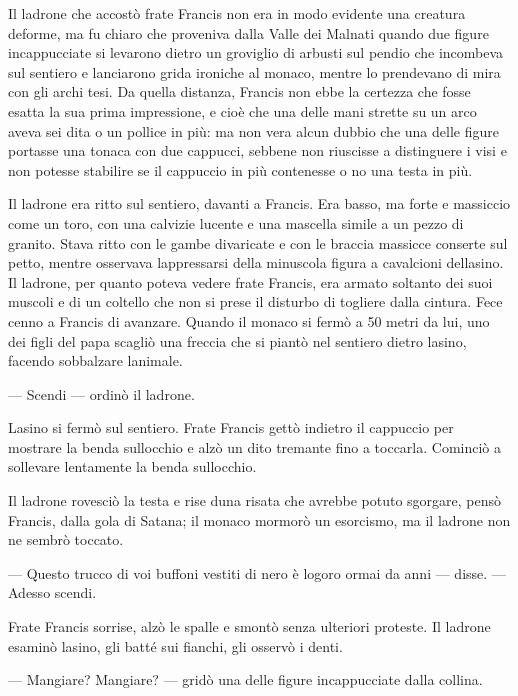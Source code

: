 Il ladrone che accostò frate Francis non era in modo evidente una
creatura deforme, ma fu chiaro che proveniva dalla Valle dei Malnati
quando due figure incappucciate si levarono dietro un groviglio di
arbusti sul pendio che incombeva sul sentiero e lanciarono grida
ironiche al monaco, mentre lo prendevano di mira con gli archi tesi. Da
quella distanza, Francis non ebbe la certezza che fosse esatta la sua
prima impressione, e cioè che una delle mani strette su un arco aveva
sei dita o un pollice in più: ma non v\textquotesingle era alcun dubbio
che una delle figure portasse una tonaca con due cappucci, sebbene non
riuscisse a distinguere i visi e non potesse stabilire se il cappuccio
in più contenesse o no una testa in più.

Il ladrone era ritto sul sentiero, davanti a Francis. Era basso, ma
forte e massiccio come un toro, con una calvizie lucente e una mascella
simile a un pezzo di granito. Stava ritto con le gambe divaricate e con
le braccia massicce conserte sul petto, mentre osservava
l\textquotesingle appressarsi della minuscola figura a cavalcioni
dell\textquotesingle asino. Il ladrone, per quanto poteva vedere frate
Francis, era armato soltanto dei suoi muscoli e di un coltello che non
si prese il disturbo di togliere dalla cintura. Fece cenno a Francis di
avanzare. Quando il monaco si fermò a 50 metri da lui, uno dei figli del
papa scagliò una freccia che si piantò nel sentiero dietro
l\textquotesingle asino, facendo sobbalzare l\textquotesingle animale.

--- Scendi --- ordinò il ladrone.

L\textquotesingle asino si fermò sul sentiero. Frate Francis gettò
indietro il cappuccio per mostrare la benda sull\textquotesingle occhio
e alzò un dito tremante fino a toccarla. Cominciò a sollevare lentamente
la benda sull\textquotesingle occhio.

Il ladrone rovesciò la testa e rise d\textquotesingle una risata che
avrebbe potuto sgorgare, pensò Francis, dalla gola di Satana; il monaco
mormorò un esorcismo, ma il ladrone non ne sembrò toccato.

--- Questo trucco di voi buffoni vestiti di nero è logoro ormai da anni
--- disse. --- Adesso scendi.

Frate Francis sorrise, alzò le spalle e smontò senza ulteriori proteste.
Il ladrone esaminò l\textquotesingle asino, gli batté sui fianchi, gli
osservò i denti.

--- Mangiare? Mangiare? --- gridò una delle figure incappucciate dalla
collina.

